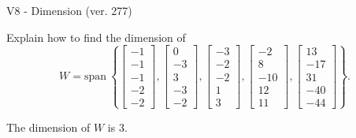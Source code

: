 \begin{exercise}
  \begin{exerciseTitle}V8 - Dimension (ver. 277)\end{exerciseTitle}
  \begin{exerciseStatement}
    Explain how to find the dimension of 
\[W=\mathrm{span}\ \left\{\left[\begin{array}{r}
-1 \\
-1 \\
-1 \\
-2 \\
-2
\end{array}\right] , \left[\begin{array}{r}
0 \\
-3 \\
3 \\
-3 \\
-2
\end{array}\right] , \left[\begin{array}{r}
-3 \\
-2 \\
-2 \\
1 \\
3
\end{array}\right] , \left[\begin{array}{r}
-2 \\
8 \\
-10 \\
12 \\
11
\end{array}\right] , \left[\begin{array}{r}
13 \\
-17 \\
31 \\
-40 \\
-44
\end{array}\right]\right\}.\]



  \end{exerciseStatement}
  \begin{exerciseAnswer}
   The dimension of \(W\) is  \(3\).
  


  \end{exerciseAnswer}
\end{exercise}